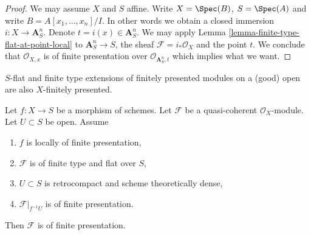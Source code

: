 \begin{proof}
We may assume $X$ and $S$ affine. Write $X = \Spec(B)$,
$S = \Spec(A)$ and write $B = A[x_1, \ldots, x_n]/I$.
In other words we obtain a closed immersion $i : X \to \mathbf{A}^n_S$.
Denote $t = i(x) \in \mathbf{A}^n_S$. We may apply
Lemma \ref{lemma-finite-type-flat-at-point-local}
to $\mathbf{A}^n_S \to S$, the sheaf $\mathcal{F} = i_*\mathcal{O}_X$
and the point $t$. We conclude that $\mathcal{O}_{X, x}$ is
of finite presentation over $\mathcal{O}_{\mathbf{A}^n_S, t}$
which implies what we want.
\end{proof}

\begin{lemma}
\label{lemma-flat-finite-type-finitely-presented-over-dense-open}
\begin{slogan}
$S$-flat and finite type extensions of finitely presented modules
on a (good) open are also $X$-finitely presented.
\end{slogan}
Let $f : X \to S$ be a morphism of schemes. Let $\mathcal{F}$ be a
quasi-coherent $\mathcal{O}_X$-module. Let $U \subset S$ be open.
Assume
\begin{enumerate}
\item $f$ is locally of finite presentation,
\item $\mathcal{F}$ is of finite type and flat over $S$,
\item $U \subset S$ is retrocompact and scheme theoretically dense,
\item $\mathcal{F}|_{f^{-1}U}$ is of finite presentation.
\end{enumerate}
Then $\mathcal{F}$ is of finite presentation.
\end{lemma}

